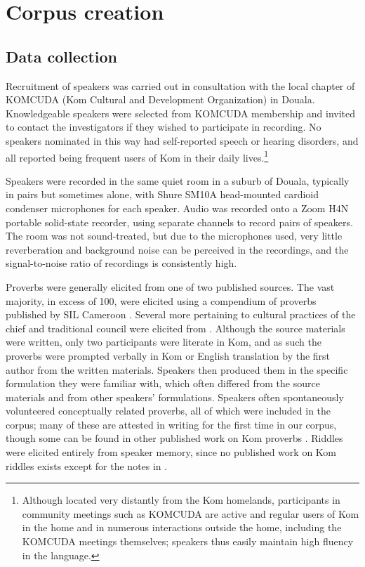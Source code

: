\documentclass[output=paper,colorlinks,citecolor=brown
]{langscibook}
\begin{document}
\section{Corpus creation} \label{corpus-construction}

\subsection{Data collection}

Recruitment of speakers was carried out in consultation with the local chapter of KOMCUDA (Kom Cultural and Development Organization) in Douala. 
Knowledgeable speakers were selected from KOMCUDA membership and invited to contact the investigators if they wished to participate in recording. 
No speakers nominated in this way had self-reported speech or hearing disorders, and all reported being frequent users of Kom in their daily lives.\footnote{Although located very distantly from the Kom homelands, participants in community meetings such as KOMCUDA are active and regular users of Kom in the home and in numerous interactions outside the home, including the KOMCUDA meetings themselves; speakers thus easily maintain high fluency in the language.} 

Speakers were recorded in the same quiet room in a suburb of Douala, typically in pairs but sometimes alone, with Shure SM10A head-mounted cardioid condenser microphones for each speaker. Audio was recorded onto a Zoom H4N portable solid-state recorder, using separate channels to record pairs of speakers.
The room was not sound-treated, but due to the microphones used, very little reverberation and background noise can be perceived in the recordings, and the signal-to-noise ratio of recordings is consistently high.

Proverbs were generally elicited from one of two published sources. The vast majority, in excess of 100, were elicited using a compendium of proverbs published by SIL Cameroon \citep{loh-timlini-i}. 
Several more pertaining to cultural practices of the chief and traditional council were elicited from \citet{loah-wisdom}. 
Although the source materials were written, only two participants were literate in Kom, and as such the proverbs were prompted verbally in Kom or English translation by the first author from the written materials. 
Speakers then produced them in the specific formulation they were familiar with, which often differed from the source materials and from other speakers' formulations. 
Speakers often spontaneously volunteered conceptually related proverbs, all of which were included in the corpus; many of these are attested in writing for the first time in our corpus, though some can be found in other published work on Kom proverbs \citep{njwe2015palm, jickngam-generic, tosam2014philosophical, chenwiorature}. 
Riddles were elicited entirely from speaker memory, since no published work on Kom riddles exists except for the notes in \citet{jickngam-generic}. 
\end{document}
